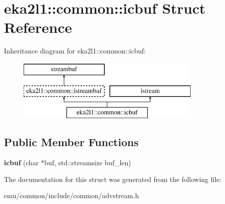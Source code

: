 \hypertarget{structeka2l1_1_1common_1_1icbuf}{}\section{eka2l1\+:\+:common\+:\+:icbuf Struct Reference}
\label{structeka2l1_1_1common_1_1icbuf}
Inheritance diagram for eka2l1\+:\+:common\+:\+:icbuf\+:\begin{figure}[H]
\begin{center}
\leavevmode
\includegraphics[height=3.000000cm]{structeka2l1_1_1common_1_1icbuf}
\end{center}
\end{figure}
\subsection*{Public Member Functions}
\begin{DoxyCompactItemize}
\item 
\mbox{\label{structeka2l1_1_1common_1_1icbuf_a34c9d26ffae022d85d37871db8646524}} 
{\bfseries icbuf} (char $\ast$buf, std\+::streamsize buf\+\_\+len)
\end{DoxyCompactItemize}


The documentation for this struct was generated from the following file\+:\begin{DoxyCompactItemize}
\item 
emu/common/include/common/advstream.\+h\end{DoxyCompactItemize}
